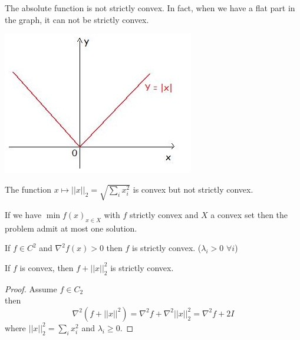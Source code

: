 \begin{example}
\begin{leftbar}
The absolute function is not strictly convex. In fact, when we have a flat part in the graph, it can not be strictly convex.
\begin{center}
  \includegraphics[scale=0.5]{./images/Course4_absolue}
\end{center}
\end{leftbar}
\end{example}
\vspace{0.5cm}
\begin{example}
\begin{leftbar}
The function $x \mapsto ||x||_{2} = \sqrt{\sum_{i} x_{i}^{2}}$ is convex but not strictly convex.
\end{leftbar}
\end{example}
\vspace{0.5cm}
\begin{property}
If we have $\min f(x)_{x \in X}$ with $f$ strictly convex and $X$ a convex set then the problem admit at most one solution.
\end{property} 
\vspace{0.5cm}
\begin{property}
If $ f \in C^{2}$ and $\nabla^{2} f(x) > 0 $ then $f$ is strictly convex. ($\lambda_{i} > 0 $ $\forall i$)
\end{property}
\vspace{0.5cm}
\begin{property}
If $f$ is convex, then $ f + ||x||^{2}_{2}$ is strictly convex.
\end{property}
\begin{proof}
Assume $f \in C_2$ 
\\then $$\nabla^{2}(f + ||x||^{2}) = \nabla^{2} f  + \nabla^{2}||x||^{2}_{2} = \nabla^{2} f + 2I
$$
where $||x||_{2}^{2} = \sum_{i} x_{i}^{2}$ and $\lambda_{i} \geq 0$.
\end{proof}
